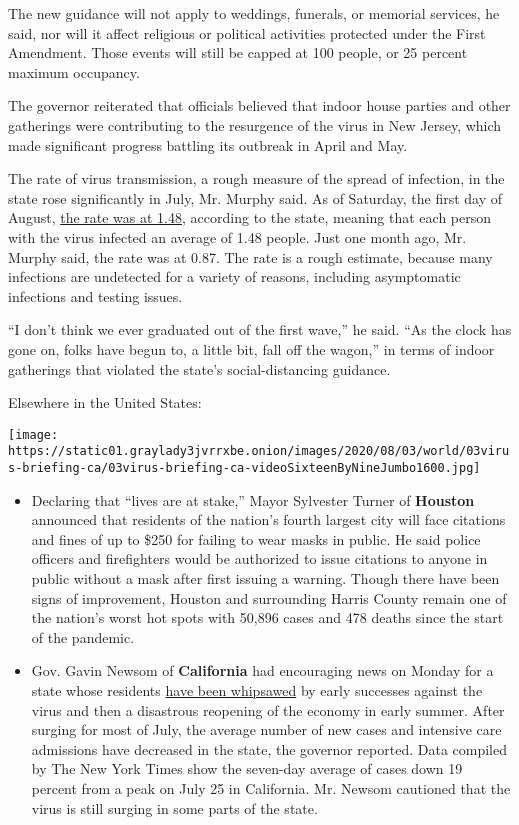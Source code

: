 The new guidance will not apply to weddings, funerals, or memorial
services, he said, nor will it affect religious or political activities
protected under the First Amendment. Those events will still be capped
at 100 people, or 25 percent maximum occupancy.

The governor reiterated that officials believed that indoor house
parties and other gatherings were contributing to the resurgence of the
virus in New Jersey, which made significant progress battling its
outbreak in April and May.

The rate of virus transmission, a rough measure of the spread of
infection, in the state rose significantly in July, Mr. Murphy said. As
of Saturday, the first day of August,
\href{https://twitter.com/GovMurphy/status/1290335172446097409/photo/2}{the
rate was at 1.48}, according to the state, meaning that each person with
the virus infected an average of 1.48 people. Just one month ago, Mr.
Murphy said, the rate was at 0.87. The rate is a rough estimate, because
many infections are undetected for a variety of reasons, including
asymptomatic infections and testing issues.

``I don't think we ever graduated out of the first wave,'' he said. ``As
the clock has gone on, folks have begun to, a little bit, fall off the
wagon,'' in terms of indoor gatherings that violated the state's
social-distancing guidance.

Elsewhere in the United States:

\texttt{[image: https://static01.graylady3jvrrxbe.onion/images/2020/08/03/world/03virus-briefing-ca/03virus-briefing-ca-videoSixteenByNineJumbo1600.jpg]}

\begin{itemize}
\item
  Declaring that ``lives are at stake,'' Mayor Sylvester Turner of
  \textbf{Houston} announced that residents of the nation's fourth
  largest city will face citations and fines of up to \$250 for failing
  to wear masks in public. He said police officers and firefighters
  would be authorized to issue citations to anyone in public without a
  mask after first issuing a warning. Though there have been signs of
  improvement, Houston and surrounding Harris County remain one of the
  nation's worst hot spots with 50,896 cases and 478 deaths since the
  start of the pandemic.
\item
  Gov. Gavin Newsom of \textbf{California} had encouraging news on
  Monday for a state whose residents
  \href{https://slack-redir.net/link?url=https\%3A\%2F\%2Fwww.nytimes3xbfgragh.onion\%2F2020\%2F07\%2F23\%2Fus\%2Fcalifornia-covid-19-cases.html}{have
  been whipsawed} by early successes against the virus and then a
  disastrous reopening of the economy in early summer. After surging for
  most of July, the average number of new cases and intensive care
  admissions have decreased in the state, the governor reported. Data
  compiled by The New York Times show the seven-day average of cases
  down 19 percent from a peak on July 25 in California. Mr. Newsom
  cautioned that the virus is still surging in some parts of the state.
\end{itemize}

